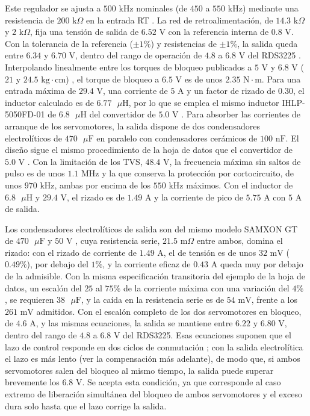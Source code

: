 \documentclass[../../General.tex]{subfiles}
\begin{document}
Este regulador se ajusta a $500\text{ kHz}$ nominales (de $450$ a $550\text{ kHz}$) mediante una resistencia de $200\text{ k}\Omega$ en la entrada RT \citep{ti_tps54560}. La red de retroalimentación, de $14.3\text{ k}\Omega$ y $2\text{ k}\Omega$, fija una tensión de salida de $6.52\text{ V}$ con la referencia interna de $0.8\text{ V}$. Con la tolerancia de la referencia ($\pm 1\%$) \citep{ti_tps54560} y resistencias de $\pm 1\%$, la salida queda entre $6.34$ y $6.70\text{ V}$, dentro del rango de operación de $4.8$ a $6.8\text{ V}$ del RDS3225 \citep{dsservo_rds3225}. Interpolando linealmente entre los torques de bloqueo publicados a $5\text{ V}$ y $6.8\text{ V}$ ($21$ y $24.5\text{ kg}\cdot\text{cm}$) \citep{dsservo_rds3225}, el torque de bloqueo a $6.5\text{ V}$ es de unos $2.35\text{ N}\cdot\text{m}$. Para una entrada máxima de $29.4\text{ V}$, una corriente de $5\text{ A}$ y un factor de rizado de $0.30$, el inductor calculado es de $6.77\text{ }\mu\text{H}$, por lo que se emplea el mismo inductor IHLP-5050FD-01 de $6.8\text{ }\mu\text{H}$ del convertidor de $5.0\text{ V}$ \citep{vishay_ihlp5050fd}. Para absorber las corrientes de arranque de los servomotores, la salida dispone de dos condensadores electrolíticos de $470\text{ }\mu\text{F}$ en paralelo con condensadores cerámicos de $100\text{ nF}$.
El diseño sigue el mismo procedimiento de la hoja de datos que el convertidor de $5.0\text{ V}$ \citep{ti_tps54560}. Con la limitación de los TVS, $48.4\text{ V}$, la frecuencia máxima sin saltos de pulso es de unos $1.1\text{ MHz}$ y la que conserva la protección por cortocircuito, de unos $970\text{ kHz}$, ambas por encima de los $550\text{ kHz}$ máximos. Con el inductor de $6.8\text{ }\mu\text{H}$ y $29.4\text{ V}$, el rizado es de $1.49\text{ A}$ y la corriente de pico de $5.75\text{ A}$ con $5\text{ A}$ de salida.

Los condensadores electrolíticos de salida son del mismo modelo SAMXON GT de $470\text{ }\mu\text{F}$ y $50\text{ V}$ \citep{samxon_gt}, cuya resistencia serie, $21.5\text{ m}\Omega$ entre ambos, domina el rizado: con el rizado de corriente de $1.49\text{ A}$, el de tensión es de unos $32\text{ mV}$ ($0.49\%$), por debajo del $1\%$, y la corriente eficaz de $0.43\text{ A}$ queda muy por debajo de la admisible. Con la misma especificación transitoria del ejemplo de la hoja de datos, un escalón del $25$ al $75\%$ de la corriente máxima con una variación del $4\%$ \citep{ti_tps54560}, se requieren $38\text{ }\mu\text{F}$, y la caída en la resistencia serie es de $54\text{ mV}$, frente a los $261\text{ mV}$ admitidos. Con el escalón completo de los dos servomotores en bloqueo, de $4.6\text{ A}$, y las mismas ecuaciones, la salida se mantiene entre $6.22$ y $6.80\text{ V}$, dentro del rango de $4.8$ a $6.8\text{ V}$ del RDS3225. Esas ecuaciones suponen que el lazo de control responde en dos ciclos de conmutación \citep{ti_tps54560}; con la salida electrolítica el lazo es más lento (ver la compensación más adelante), de modo que, si ambos servomotores salen del bloqueo al mismo tiempo, la salida puede superar brevemente los $6.8\text{ V}$. Se acepta esta condición, ya que corresponde al caso extremo de liberación simultánea del bloqueo de ambos servomotores y el exceso dura solo hasta que el lazo corrige la salida.
\end{document}

